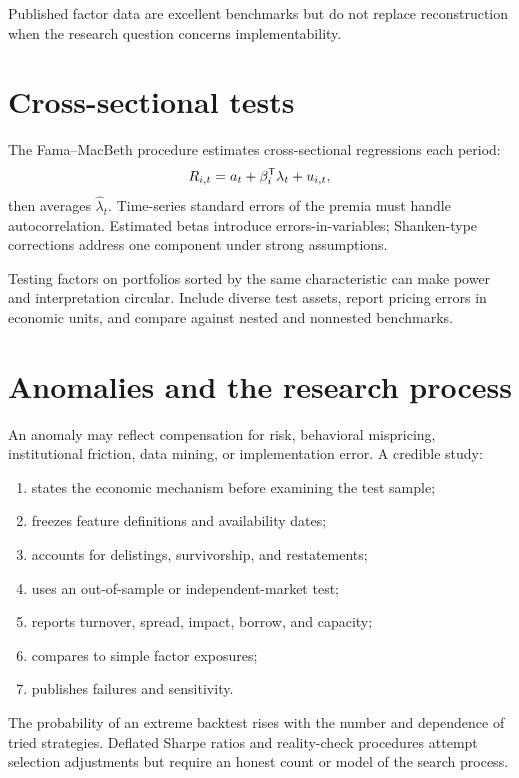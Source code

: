 Published factor data are excellent benchmarks but do not replace reconstruction
when the research question concerns implementability.

\section{Cross-sectional tests}

The Fama--MacBeth procedure estimates cross-sectional regressions each period:
\[
R_{i,t}=a_t+\beta_i^\mathsf T\lambda_t+u_{i,t},
\]
then averages $\widehat\lambda_t$. Time-series standard errors of the premia must
handle autocorrelation. Estimated betas introduce errors-in-variables; Shanken-type
corrections address one component under strong assumptions.

Testing factors on portfolios sorted by the same characteristic can make power and
interpretation circular. Include diverse test assets, report pricing errors in
economic units, and compare against nested and nonnested benchmarks.

\section{Anomalies and the research process}

An anomaly may reflect compensation for risk, behavioral mispricing, institutional
friction, data mining, or implementation error. A credible study:

\begin{enumerate}
\item states the economic mechanism before examining the test sample;
\item freezes feature definitions and availability dates;
\item accounts for delistings, survivorship, and restatements;
\item uses an out-of-sample or independent-market test;
\item reports turnover, spread, impact, borrow, and capacity;
\item compares to simple factor exposures;
\item publishes failures and sensitivity.
\end{enumerate}

The probability of an extreme backtest rises with the number and dependence of tried
strategies. Deflated Sharpe ratios and reality-check procedures attempt selection
adjustments but require an honest count or model of the search process.

